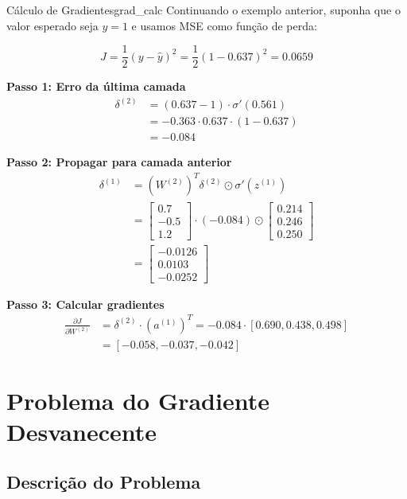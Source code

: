 \documentclass[a4paper,12pt]{article}
\newcommand{\grad}[2]{\frac{\partial #1}{\partial #2}}
\begin{document}
\begin{exemplo}{Cálculo de Gradientes}{grad_calc}
Continuando o exemplo anterior, suponha que o valor esperado seja $y = 1$ e usamos MSE como função de perda:

$$J = \frac{1}{2}(y - \hat{y})^2 = \frac{1}{2}(1 - 0.637)^2 = 0.0659$$

\textbf{Passo 1: Erro da última camada}
\begin{align}
\delta^{(2)} &= (0.637 - 1) \cdot \sigma'(0.561) \\
&= -0.363 \cdot 0.637 \cdot (1 - 0.637) \\
&= -0.084
\end{align}

\textbf{Passo 2: Propagar para camada anterior}
\begin{align}
\delta^{(1)} &= (W^{(2)})^T \delta^{(2)} \odot \sigma'(z^{(1)}) \\
&= \begin{bmatrix} 0.7 \\ -0.5 \\ 1.2 \end{bmatrix} \cdot (-0.084) \odot \begin{bmatrix} 0.214 \\ 0.246 \\ 0.250 \end{bmatrix} \\
&= \begin{bmatrix} -0.0126 \\ 0.0103 \\ -0.0252 \end{bmatrix}
\end{align}

\textbf{Passo 3: Calcular gradientes}
\begin{align}
\grad{J}{W^{(2)}} &= \delta^{(2)} \cdot (a^{(1)})^T = -0.084 \cdot [0.690, 0.438, 0.498] \\
&= [-0.058, -0.037, -0.042]
\end{align}
\end{exemplo}

\section{Problema do Gradiente Desvanecente}

\subsection{Descrição do Problema}
\end{document}
